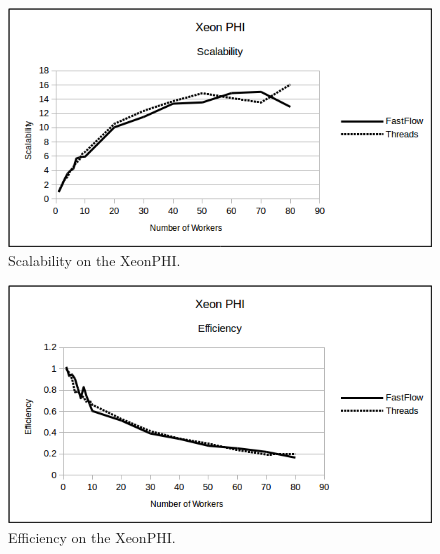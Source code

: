 \documentclass[10pt]{article}
\numberwithin{equation}{section}
\begin{document}
\begin{figure} 
	\centering
	\includegraphics[scale=.75]{XeonPHI_Scalability.png}
	\caption{Scalability on the XeonPHI.}
	\label{fig:xeonphiscalability}
\end{figure}

\begin{figure} 
	\centering
	\includegraphics[scale=.75]{XeonPHI_Efficiency.png}
	\caption{Efficiency on the XeonPHI.}
	\label{fig:xeonphiefficiency}
\end{figure}
\end{document}
